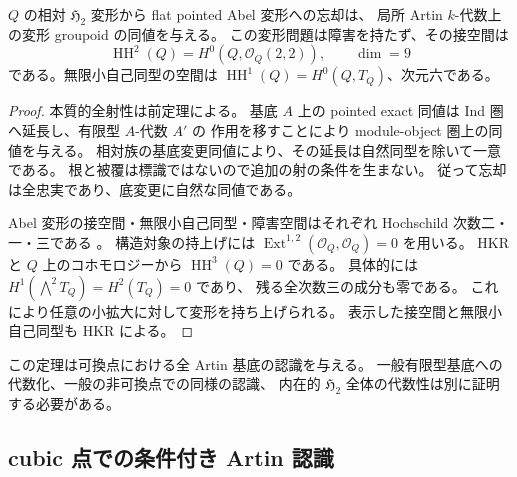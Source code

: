 \begin{corollary}[可換点での形式変形問題]
\label{cor:quadric-formal-deformation-equivalence}
$Q$ の相対 $\mathfrak H_2$ 変形から flat pointed Abel 変形への忘却は、
局所 Artin $k$-代数上の変形 groupoid の同値を与える。
この変形問題は障害を持たず、その接空間は
\[
 \operatorname{HH}^2(Q)=H^0(Q,\mathcal O_Q(2,2)),\qquad \dim=9
\]
である。無限小自己同型の空間は $\operatorname{HH}^1(Q)=H^0(Q,T_Q)$、次元六である。
\end{corollary}
\begin{proof}
本質的全射性は前定理による。
基底 $A$ 上の pointed exact 同値は Ind 圏へ延長し、有限型 $A$-代数 $A'$ の
作用を移すことにより module-object 圏上の同値を与える。
相対族の基底変更同値により、その延長は自然同型を除いて一意である。
根と被覆は標識ではないので追加の射の条件を生まない。
従って忘却は全忠実であり、底変更に自然な同値である。

Abel 変形の接空間・無限小自己同型・障害空間はそれぞれ
Hochschild 次数二・一・三である
\cite[Theorem 3.1, Remark 3.5]{LowenVanDenBergh2005}。
構造対象の持上げには $\operatorname{Ext}^{1,2}(\mathcal O_Q,\mathcal O_Q)=0$ を用いる。
HKR と $Q$ 上のコホモロジーから $\operatorname{HH}^3(Q)=0$ である。
具体的には $H^1(\bigwedge^2T_Q)=H^2(T_Q)=0$ であり、
残る全次数三の成分も零である。
これにより任意の小拡大に対して変形を持ち上げられる。
表示した接空間と無限小自己同型も HKR による。
\end{proof}

この定理は可換点における全 Artin 基底の認識を与える。
一般有限型基底への代数化、一般の非可換点での同様の認識、
内在的 $\mathfrak H_2$ 全体の代数性は別に証明する必要がある。

\subsection{cubic 点での条件付き Artin 認識}

